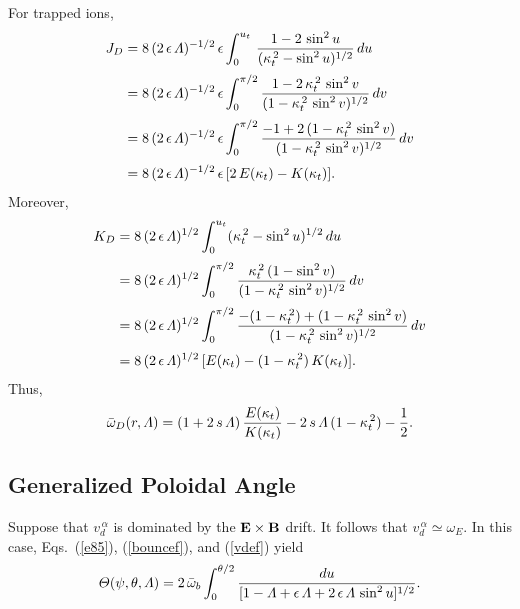 \documentclass[12pt,prb,aps,notitlepage]{revtex4-1}
\begin{document}
For trapped ions,
\begin{align}
J_D &= 8\,(2\,\epsilon\,{\mit\Lambda})^{-1/2}\,\epsilon\int_0^{u_t}\,\frac{1-2\,\sin^2 u}{(\kappa_t^{\,2}-\sin^2 u)^{1/2}}\,du\nonumber\\[0.5ex]
&= 8\,(2\,\epsilon\,{\mit\Lambda})^{-1/2}\,\epsilon\int_0^{\pi/2}\frac{1-2\,\kappa_t^{\,2}\,\sin^2 v}{(1-\kappa_t^{\,2}\,\sin^2 v)^{1/2}}\,dv\nonumber\\[0.5ex]
&=8\,(2\,\epsilon\,{\mit\Lambda})^{-1/2}\,\epsilon\int_0^{\pi/2}\frac{-1+2\,(1-\kappa_t^{\,2}\,\sin^2 v)}{(1-\kappa_t^{\,2}\,\sin^2 v)^{1/2}}\,dv\nonumber\\[0.5ex]
&= 8\,(2\,\epsilon\,{\mit\Lambda})^{-1/2}\,\epsilon\,[2\,E(\kappa_t) - K(\kappa_t)].
\end{align}
Moreover, 
\begin{align}
K_D&= 8\,(2\,\epsilon\,{\mit\Lambda})^{1/2}\int_0^{u_t} (\kappa_t^{\,2}-\sin^2 u)^{1/2}\,du\nonumber\\[0.5ex]
&= 8\,(2\,\epsilon\,{\mit\Lambda})^{1/2}\int_0^{\pi/2} \frac{\kappa_t^{\,2}\,(1-\sin^2 v)}{(1-\kappa_t^{\,2}\,\sin^2 v)^{1/2}}\,dv\nonumber\\[0.5ex]
&= 8\,(2\,\epsilon\,{\mit\Lambda})^{1/2}\int_0^{\pi/2} \frac{-(1-\kappa_t^{\,2})+(1-\kappa_t^{\,2}\,\sin^2 v)}{(1-\kappa_t^{\,2}\,\sin^2 v)^{1/2}}\,dv
\nonumber\\[0.5ex]
&= 8\,(2\,\epsilon\,{\mit\Lambda})^{1/2}\,[E(\kappa_t)-(1-\kappa_t^{\,2})\,K(\kappa_t)].
\end{align}
Thus,
\begin{equation}
\bar{\omega}_D(r,{\mit\Lambda}) =(1+2\,s\,{\mit\Lambda})\,\frac{E(\kappa_t)}{K(\kappa_t)} -2\,s\,{\mit\Lambda}\,(1-\kappa_t^{\,2})-\frac{1}{2}.
\end{equation}

\subsection{Generalized Poloidal Angle}
Suppose that $v_d^{\,\alpha}$ is dominated by the ${\bf E}\times {\bf B}$ drift. It follows that $v_d^{\,\alpha}\simeq \omega_E$. 
In this case, Eqs.~(\ref{e85}), (\ref{bouncef}), and (\ref{vdef}) yield
\begin{equation}
{\mit\Theta}(\psi,\theta,{\mit\Lambda}) =2\, \bar{\omega}_b\int_0^{\theta/2}\frac{du}{[1- {\mit\Lambda} +\epsilon\,{\mit\Lambda}+ 2\,\epsilon\,{\mit\Lambda}\,\sin^2 u]^{1/2}}.
\end{equation}
\end{document}
